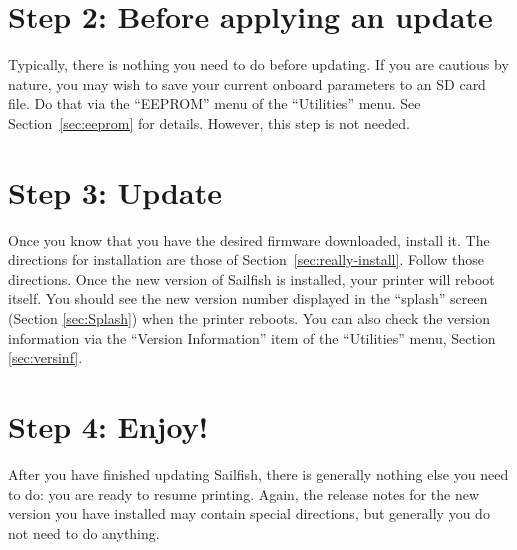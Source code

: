 
\section{Step 2: Before applying an update}

Typically, there is nothing you need to do before updating.  If you are
cautious by nature, you may wish to save your current onboard parameters
to an SD card file.  Do that via the ``EEPROM'' menu of the ``Utilities''
menu.  See Section~\ref{sec:eeprom} for details.
However, this step is not needed.


\section{Step 3: Update}

Once you know that you have the desired firmware downloaded, install it.  The directions for installation are those of
Section~\ref{sec:really-install}.  Follow
those directions.  Once the new version of Sailfish is installed, your
printer will reboot itself.  You should see the new version number displayed
in the ``splash'' screen (Section \ref{sec:Splash}) when the printer reboots.  You can also check the
version information via the ``Version Information'' item of the
``Utilities'' menu, Section \ref{sec:versinf}.


\section{Step 4: Enjoy!}

After you have finished updating Sailfish, there is generally nothing else
you need to do: you are ready to resume printing.  Again, the release notes
for the new version you have installed may contain special directions,
but generally you do not need to do anything.
